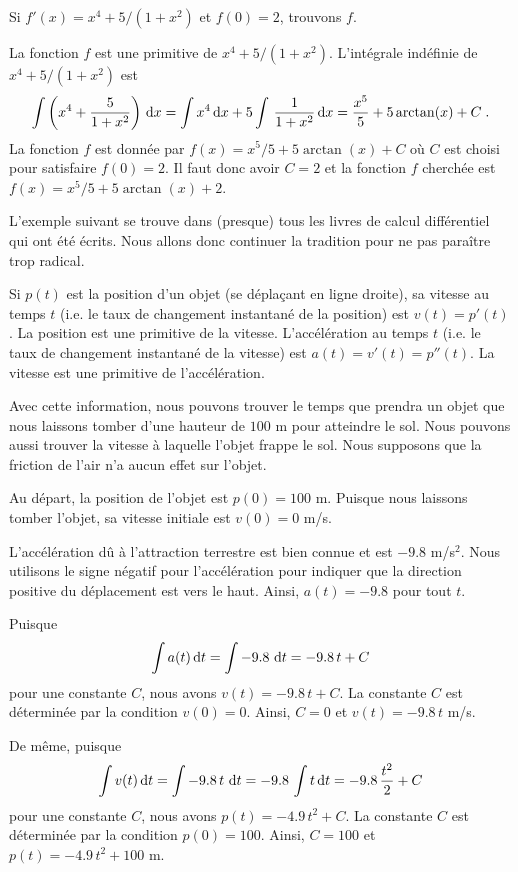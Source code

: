 {\begin{egg}
Si $f'(x) = x^4 + 5/(1+x^2)$ et $f(0)=2$, trouvons $f$.

La fonction $f$ est une primitive de $x^4 + 5/(1+x^2)$.  L'intégrale
indéfinie de $x^4 + 5/(1+x^2)$ est
\[
\int \left( x^4 + \frac{5}{1+x^2} \right) \,\mathrm{d}x
= \int  x^4  \,\mathrm{d}x + 5 \int\, \frac{1}{1+x^2}  \,\mathrm{d}x
= \frac{x^5}{5} + 5 \arctan(x) + C \; .
\]
La fonction $f$ est donnée par $f(x) = x^5/5 + 5 \arctan(x) + C$ où
$C$ est choisi pour satisfaire $f(0)=2$.  Il faut donc avoir $C=2$ et
la fonction $f$ cherchée est $f(x) = x^5/5 + 5 \arctan(x) + 2$.
\end{egg}

\begin{egg}
L'exemple suivant se trouve dans (presque) tous les livres de calcul
différentiel qui ont été écrits.  Nous allons donc continuer la tradition
pour ne pas paraître trop radical.

Si $p(t)$ est la position d'un objet (se déplaçant en ligne droite),
sa vitesse au temps $t$ (i.e. le taux de changement instantané de la
position) est $v(t) = p'(t)$.  La position est une primitive de la
vitesse. L'accélération au temps $t$ (i.e. le taux de changement
instantané de la vitesse) est $a(t) = v'(t) = p''(t)$.  La vitesse est
une primitive de l'accélération.

Avec cette information, nous pouvons trouver le temps que prendra un objet
que nous laissons tomber d'une hauteur de $100$ m pour atteindre le sol.
Nous pouvons aussi trouver la vitesse à laquelle l'objet frappe le
sol.  Nous supposons que la friction de l'air n'a aucun effet sur l'objet.

Au départ, la position de l'objet est $p(0) = 100$ m.  Puisque nous
laissons tomber l'objet, sa vitesse initiale est $v(0)=0$ m/s.

L'accélération dû à l'attraction terrestre est bien connue et est
$-9.8$ m/s$^2$.  Nous utilisons le signe négatif pour l'accélération
pour indiquer que la direction positive du déplacement est vers le
haut.  Ainsi, $a(t) = -9.8$ pour tout $t$.

Puisque
\[
\int a(t)  \,\mathrm{d}t = \int -9.8 \, \,\mathrm{d}t = -9.8\, t + C
\]
pour une constante $C$, nous avons $v(t) = -9.8\,t +C$.  La constante $C$
est déterminée par la condition $v(0)=0$.  Ainsi, $C=0$ et
$v(t) = -9.8\, t$ m/s.

De même, puisque
\[
\int v(t)  \,\mathrm{d}t = \int -9.8 \,t\, \,\mathrm{d}t = -9.8\, \int t \,\mathrm{d}t
= -9.8 \, \frac{t^2}{2} + C
\]
pour une constante $C$, nous avons $p(t) = -4.9\,t^2 + C$.  La constante $C$
est déterminée par la condition $p(0) = 100$.  Ainsi, $C=100$ et
$p(t) = -4.9\, t^2 + 100$ m.


\end{egg}}
